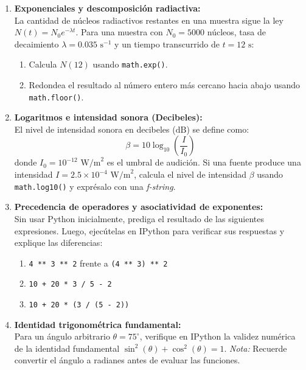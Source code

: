 \documentclass[12pt]{article}
\begin{document}
\begin{problemas}[]
\begin{enumerate}[leftmargin=*]
    \item \textbf{Exponenciales y descomposición radiactiva:} \\
    La cantidad de núcleos radiactivos restantes en una muestra sigue la ley $N(t) = N_0 e^{-\lambda t}$.
    Para una muestra con $N_0 = 5000$ núcleos, tasa de decaimiento $\lambda = 0.035\text{ s}^{-1}$ y un tiempo transcurrido de $t = 12\text{ s}$:
    \begin{enumerate}
        \item Calcula $N(12)$ usando \texttt{math.exp()}.
        \item Redondea el resultado al número entero más cercano hacia abajo usando \texttt{math.floor()}.
    \end{enumerate}

    \item \textbf{Logaritmos e intensidad sonora (Decibeles):} \\
    El nivel de intensidad sonora en decibeles ($\text{dB}$) se define como:
    \[
    \beta = 10 \log_{10}\left(\frac{I}{I_0}\right)
    \]
    donde $I_0 = 10^{-12}\text{ W/m}^2$ es el umbral de audición. Si una fuente produce una intensidad $I = 2.5 \times 10^{-4}\text{ W/m}^2$, calcula el nivel de intensidad $\beta$ usando \texttt{math.log10()} y exprésalo con una \textit{f-string}.

    \item \textbf{Precedencia de operadores y asociatividad de exponentes:} \\
    Sin usar Python inicialmente, prediga el resultado de las siguientes expresiones. Luego, ejecútelas en IPython para verificar sus respuestas y explique las diferencias:
    \begin{enumerate}
        \item \lstinline|4 ** 3 ** 2| frente a \lstinline|(4 ** 3) ** 2|
        \item \lstinline|10 + 20 * 3 / 5 - 2|
        \item \lstinline|10 + 20 * (3 / (5 - 2))|
    \end{enumerate}


    \item \textbf{Identidad trigonométrica fundamental:} \\
    Para un ángulo arbitrario $\theta = 75^\circ$, verifique en IPython la validez numérica de la identidad fundamental $\sin^2(\theta) + \cos^2(\theta) = 1$.
    \textit{Nota:} Recuerde convertir el ángulo a radianes antes de evaluar las funciones.

\end{enumerate}

\end{problemas}



\label{LastPage}
\end{document}
